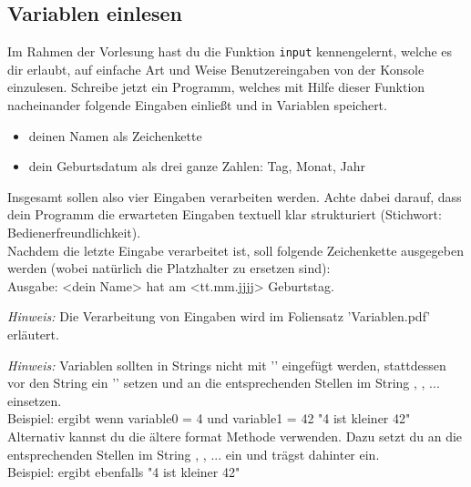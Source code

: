 \subsection{Variablen einlesen}
Im Rahmen der Vorlesung hast du die Funktion \texttt{input} kennengelernt, welche es dir erlaubt, auf einfache Art und Weise Benutzereingaben von der Konsole einzulesen. Schreibe jetzt ein Programm, welches mit Hilfe dieser Funktion nacheinander folgende Eingaben einließt und in Variablen speichert. 
\begin{itemize}
	\item deinen Namen als Zeichenkette
	\item dein Geburtsdatum als drei ganze Zahlen: Tag, Monat, Jahr
\end {itemize}
Insgesamt sollen also vier Eingaben verarbeiten werden. Achte dabei darauf, dass dein Programm die erwarteten Eingaben textuell klar strukturiert (Stichwort: Bedienerfreundlichkeit).\\Nachdem die letzte Eingabe verarbeitet ist, soll folgende Zeichenkette ausgegeben werden (wobei natürlich die Platzhalter zu ersetzen sind):\\Ausgabe: {\ttfamily{\dq}}<dein Name> hat am <tt.mm.jjjj> Geburtstag.{\ttfamily{\dq}}

\textit{Hinweis:} Die Verarbeitung von Eingaben wird im Foliensatz 'Variablen.pdf' erläutert.

\textit{Hinweis:} Variablen sollten in Strings nicht mit '\pythoninline{+}' eingefügt werden, stattdessen vor den String ein '' setzen und an die entsprechenden Stellen im String , , ... einsetzen. \\
Beispiel:  ergibt wenn variable0 = 4 und variable1 = 42 "4 ist kleiner 42"\\
Alternativ kannst du die ältere format Methode verwenden. Dazu setzt du an die entsprechenden Stellen im String , , ... ein und trägst dahinter  ein.\\
Beispiel:  ergibt ebenfalls "4 ist kleiner 42"

